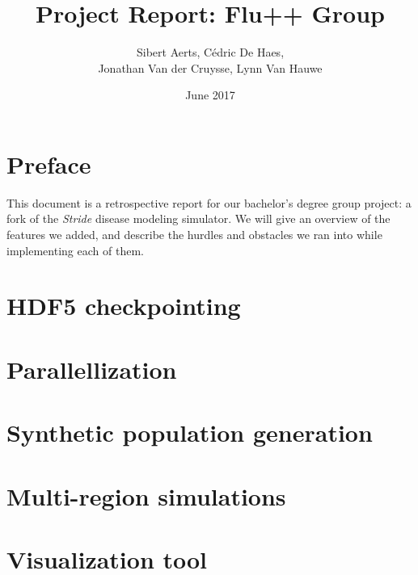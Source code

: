 \documentclass[a4paper,12pt]{article}
\title{Project Report: Flu++ Group}
\author{Sibert Aerts, C\'edric De Haes,\\ Jonathan Van der Cruysse, Lynn Van Hauwe}
\date{June 2017}
\begin{document}
\maketitle
\section*{Preface}
This document is a retrospective report for our bachelor's degree group project: a fork of the \emph{Stride} disease modeling simulator. \autocite{bachelorproef} We will give an overview of the features we added, and describe the hurdles and obstacles we ran into while implementing each of them.

\tableofcontents
\pagebreak

\section{HDF5 checkpointing}

\section{Parallellization}

\section{Synthetic population generation}

\section{Multi-region simulations}

\section{Visualization tool}

\pagebreak
\printbibliography
\end{document}
